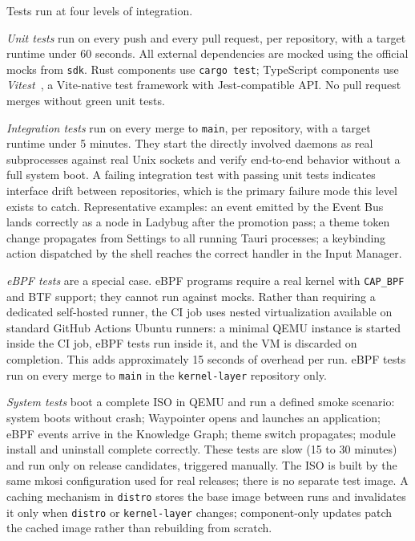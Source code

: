 Tests run at four levels of integration.

\emph{Unit tests} run on every push and every pull request, per repository,
with a target runtime under 60 seconds. All external dependencies are mocked
using the official mocks from \texttt{sdk}. Rust components use
\texttt{cargo test}; TypeScript components use \emph{Vitest}~\cite{vitest},
a Vite-native test framework with Jest-compatible API. No pull request merges
without green unit tests.

\emph{Integration tests} run on every merge to \texttt{main}, per repository,
with a target runtime under 5 minutes. They start the directly involved
daemons as real subprocesses against real Unix sockets and verify end-to-end
behavior without a full system boot. A failing integration test with passing
unit tests indicates interface drift between repositories, which is the primary
failure mode this level exists to catch. Representative examples: an event
emitted by the Event Bus lands correctly as a node in Ladybug after the
promotion pass; a theme token change propagates from Settings to all running
Tauri processes; a keybinding action dispatched by the shell reaches the
correct handler in the Input Manager.

\emph{eBPF tests} are a special case. eBPF programs require a real kernel with
\texttt{CAP\_BPF} and BTF support; they cannot run against mocks. Rather than
requiring a dedicated self-hosted runner, the CI job uses nested virtualization
available on standard GitHub Actions Ubuntu runners: a minimal QEMU instance
is started inside the CI job, eBPF tests run inside it, and the VM is
discarded on completion. This adds approximately 15 seconds of overhead per
run. eBPF tests run on every merge to \texttt{main} in the
\texttt{kernel-layer} repository only.

\emph{System tests} boot a complete ISO in QEMU and run a defined smoke
scenario: system boots without crash; Waypointer opens and launches an
application; eBPF events arrive in the Knowledge Graph; theme switch
propagates; module install and uninstall complete correctly. These tests are
slow (15 to 30 minutes) and run only on release candidates, triggered
manually. The ISO is built by the same mkosi configuration used for real
releases; there is no separate test image. A caching mechanism in
\texttt{distro} stores the base image between runs and invalidates it only
when \texttt{distro} or \texttt{kernel-layer} changes; component-only updates
patch the cached image rather than rebuilding from scratch.

